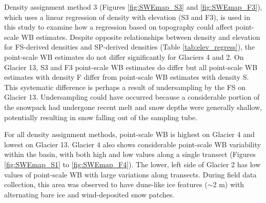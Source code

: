 \documentclass{sfuthesis}
\begin{document}
Density assignment method 3 (Figures \ref{fig:SWEmap_S3} and \ref{fig:SWEmap_F3}), which uses a linear regression of density with elevation (S3 and F3), is used in this study to examine how a regression based on topography could affect point-scale WB estimates. Despite opposite relationships between density and elevation for FS-derived densities and SP-derived densities (Table \ref{tab:elev_regress}), the point-scale WB estimates do not differ significantly for Glaciers 4 and 2. On Glacier 13, S3 and F3 point-scale WB estimates do differ but all point-scale WB estimates with density F differ from point-scale WB estimates with density S. This systematic difference is perhaps a result of undersampling by the FS on Glacier 13. Undersampling could have occurred because a considerable portion of the snowpack had undergone recent melt and snow depths were generally shallow, potentially resulting in snow falling out of the sampling tube. 

For all density assignment methods, point-scale WB is highest on Glacier 4 and lowest on Glacier 13. Glacier 4 also shows considerable point-scale WB variability within the basin, with both high and low values along a single transect (Figures \ref{fig:SWEmap_S1} to \ref{fig:SWEmap_F4}). The lower, left side of Glacier 2 has low values of point-scale WB with large variations along transects. During field data collection, this area was observed to have dune-like ice features ($\sim$2 m) with alternating bare ice and wind-deposited snow patches.
\end{document}
